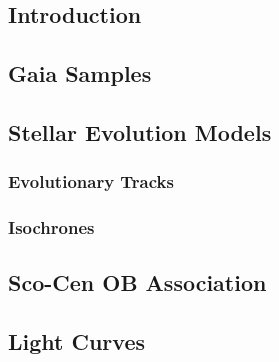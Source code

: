 \chapter{\textbf{}}\label{ch: Data}

\section{Introduction}
\section{Gaia Samples}
\section{Stellar Evolution Models}
\subsection{Evolutionary Tracks}
\subsection{Isochrones}
\section{Sco-Cen OB Association}
\section{Light Curves}





